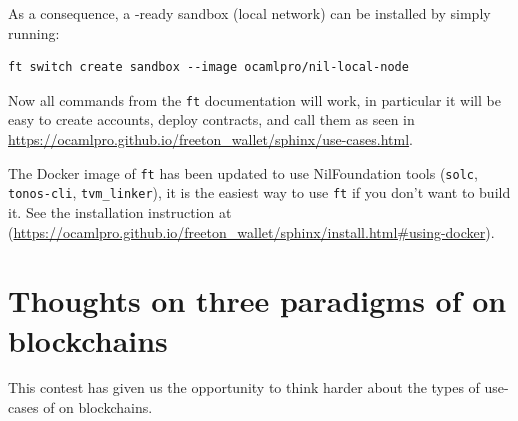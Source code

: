 \documentclass[10pt,a4paper]{article}
\begin{document}
As a consequence, a \zksnark-ready sandbox (local network) can be
installed by simply running:

\begin{lstlisting}[style=BashInputStyle]
ft switch create sandbox --image ocamlpro/nil-local-node
\end{lstlisting}

Now all commands from the \lstinline|ft| documentation will work, in
particular it will be easy to create accounts, deploy contracts, and
call them as seen in
\url{https://ocamlpro.github.io/freeton_wallet/sphinx/use-cases.html}.

The Docker image of \lstinline|ft| has been updated to use
NilFoundation tools
(\lstinline|solc|, \lstinline|tonos-cli|, \lstinline|tvm_linker|), it is
the easiest way to use \lstinline|ft| if you don't want to build
it. See the installation instruction at
(\url{https://ocamlpro.github.io/freeton_wallet/sphinx/install.html#using-docker}).

\section{Thoughts on three paradigms of \zksnarks{} on blockchains}
\label{sec_three_paradigms}
This contest has given us the opportunity to think harder about the types of use-cases of \zksnarks{} on blockchains.
\end{document}
